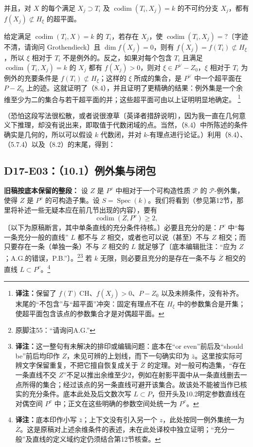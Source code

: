 \documentclass[UTF8,a4paper]{ctexbook}
\newcommand{\transnote}[1]{\ifhmode\unskip\nobreak\fi\footnote{\textbf{译注：}#1}}
\DeclareMathOperator{\codim}{codim}
\begin{document}
并且，对 $X$ 的每个满足 $X_j\supset T_i$ 及 $\codim(T_i,X_j)=k$ 的不可约分支 $X_j$，都有 $f(X_j)\not\subset H_\xi$ 的超平面。

给定满足 $\codim(T_i,X)=k$ 的 $T_i$，若存在 $X_j$，使 $\codim(T_i,X_j)=?$〔字迹不清，请询问 Grothendieck〕且 $\dim f(X_j)=0$，则有 $f(X_j)=f(T_i)\not\subset H_\xi$，所以 $\xi$ 相对于 $T_i$ 不是例外的。反之，如果对每个包含 $T_i$ 且满足 $\codim(T_i,X_j)=k$ 的 $X_j$ 都有 $f(X_j)>0$，则对 $\xi\in P^\vee-Z_0$，$\xi$ 相对于 $T_i$ 为例外的充要条件是 $f(T_i)\not\subset H_\xi$；这样的 $\xi$ 所成的集合，是 $P^\vee$ 中一个超平面在 $P-Z_0$ 上的迹。这就证明了（8.4），并且证明了更精确的结果：例外集是一个余维至少为二的集合与若干超平面的并；这些超平面可由以上证明明显地确定。
\transnote{保留了 $f(T)\ \mathrm{CH}$、$f(X_j)>0$、$P-Z_0$ 以及未辨条件，没有补齐。末尾的“不包含”与“超平面”冲突：固定有理点不在 $H_\xi$ 中的参数集合是开集；使超平面包含该点的参数集合才是对偶超平面。}

（恐怕这段写法很松散，或者说很潦草〔英译者措辞说明〕，因为我一直在几何意义下推理，却没有说出来，即取值于代数闭域的点。当然，（8.4）中所陈述的条件确实是几何的，所以可以假设 $k$ 代数闭，并对 $k$-有理点进行论证。）利用（8.4）、（5.7.4）以及（8.2）的末尾，得到：


\subsection*{D17-E03：（10.1）例外集与闭包}
\noindent\textbf{旧稿按底本保留的整段：}
设 $Z$ 是 $P^v$ 中相对于一个可构造性质 $\mathcal P$ 的 $\mathcal P$-例外集，使得 $Z$ 是 $P^v$ 的可构造子集。设 $S=\operatorname{Spec}(k)$。我们将看到（参见第12节，那里将补述一些无疑本应在前几节出现的内容），要有
\[
\operatorname{codim}(Z,P^v)\ge2,
\]
〔以下为原稿断言，其中单条直线的充分条件待核。〕必要且充分的是：$P^v$ 中“每一条充分一般的直线” $L$ 都不与 $Z$ 相交，或者也可以说（甚至）不与 $Z$ 相交；而只要存在一条（单独一条）不与 $Z$ 相交的 $L$ 就足够了〔底本编辑批注：“应为 $Z$；A.G.的错误，P.B.”〕。\footnote{原脚注55：“请询问A.G.”}\transnote{这一整句有未解决的排印或编辑问题：底本在“or even”前后及“should be”前后均印作 $Z$，未见可辨的上划线，而下一句确实印为 $\bar z$。这里按实际可辨文字保留重复，不把它擅自恢复成关于 $\overline Z$ 的定理。对一般可构造集，“存在一条直线不交 $Z$”不足以推出余维至少2，例如在射影平面中从一条直线删去一点所得的集合；经过该点的另一条直线可避开该集合。故该处不能被当作已核实的充分条件。底本此处及后文数次写 $L\subset P$，但开头及10.2明定参数直线在对偶空间 $P^v$ 中；正文在这些明确的参数空间处统一为 $P^v$。}
若 $k$ 无限，则必要且充分的是存在一条不与 $\overline Z$ 相交的直线 $L\subset P^v$。\transnote{底本印作小写 $\bar z$；上下文没有引入另一个 $z$，此处按同一例外集统一为 $\overline Z$。这是原稿对上述余维条件的表述，未在此处译校中独立证明；“充分一般”及直线的定义域约定仍须结合第12节核查。}
\end{document}

